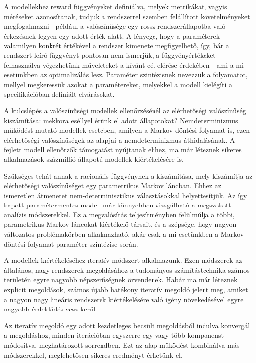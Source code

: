 A modellekhez reward függvényeket definiálva, melyek metrikákat, vagyis méréseket azonosítanak, tudjuk a rendszerrel szemben felállított követelményeket megfogalmazni - például a valószínűsége egy rossz rendszerállapotba való érkezésnek legyen egy adott érték alatt. A lényege, hogy a paraméterek valamilyen konkrét értékével a rendszer kimenete megfigyelhető, így, bár a rendszert leíró függvényt pontosan nem ismerjük, a függvényértékeket felhasználva végezhetünk műveleteket a kívánt cél elérése érdekében - ami a mi esetünkben az optimalizálás lesz. Paraméter szintézisnek nevezzük a folyamatot, mellyel megkeressük azokat a paramétereket, melyekkel a modell kielégíti a specifikációban definiált elvárásokat.

A kulcslépés a valószínűségi modellek ellenőrzésénél az elérhetőségi valószínűség kiszámítása: mekkora eséllyel érünk el adott állapotokat? Nemdeterminizmus működést mutató modellek esetében, amilyen a Markov döntési folyamat is, ezen elérhetőségi valószínűségek az alapjai a nemdeterminizmus áthidalásának. A fejlett modell ellenőrzők támogatást nyújtanak ehhez, ma már léteznek sikeres alkalmazások százmillió állapotú modellek kiértékelésére is.

Szükséges tehát annak a racionális függvénynek a kiszámítása, mely kiszámítja az elérhetőségi valószínűséget egy parametrikus Markov láncban.
Ehhez az ismeretlen átmenetet nem-determinisztikus választásokkal helyettesítjük. Az így kapott paramétermentes modell már könnyebben vizsgálható a megszokott analízis módszerekkel. Ez a megvalósítás teljesítményben felülmúlja a többi, parametrikus Markov láncokat kiértékelő társait, és a szépsége, hogy nagyon változatos problémakörben alkalmazható, akár csak a mi esetünkben a Markov döntési folyamat paraméter szintézise során.\cite{ParameterSzintezisCikk}

A modellek kiértékeléséhez iteratív módszert alkalmazunk. Ezen módszerek az általános, nagy %
rendszerek megoldásához a tudományos számítástechnika számos területén egyre nagyobb népszerűségnek örvendenek. Habár ma már léteznek explicit megoldások, számos újabb hatékony iteratív megoldó %
jelent meg, amiket a nagyon nagy lineáris rendszerek kiértékelésére való igény növekedésével egyre nagyobb érdeklődés vesz kerül.

Az iteratív megoldó egy adott kezdetleges becsült megoldásból indulva konvergál a megoldáshoz, minden iterációban egyszerre egy vagy több komponenst módosítva, meghatározott sorrendben. Ezt az alap működést kombinálva más módszerekkel, meglehetősen sikeres eredményt érhetünk el.\cite{SolverKonyv}


